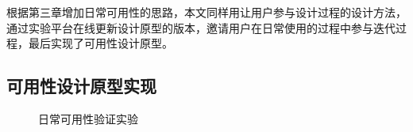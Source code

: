 根据第三章增加日常可用性的思路，本文同样用让用户参与设计过程的设计方法，通过实验平台在线更新设计原型的版本，邀请用户在日常使用的过程中参与迭代过程，最后实现了可用性设计原型。

\subsection{可用性设计原型实现}

\begin{figure}[h]
    \centering
    \caption{日常可用性验证实验}
    \label{fig:interface}
\end{figure}


